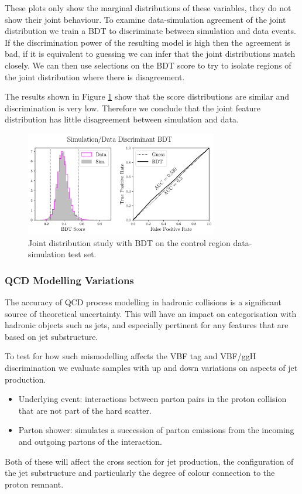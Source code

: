 These plots only show the marginal distributions of these variables, they do not show their joint behaviour. 
To examine data-simulation agreement of the joint distribution we train a BDT to discriminate between simulation and data events. 
If the discrimination power of the resulting model is high then the agreement is bad, if it is equivalent to guessing we can infer that the joint distributions match closely. 
We can then use selections on the BDT score to try to isolate regions of the joint distribution where there is disagreement. 

The results shown in Figure \ref{fig:event_categorisation:zee_bdt_validation} show that the score distributions are similar and discrimination is very low. 
Therefore we conclude that the joint feature distribution has little disagreement between simulation and data. 
\begin{figure}[h!]
    \includegraphics[width=0.75\textwidth]{figures/event_selection/eng_feature_ROC_Zee_BDT.pdf}
    \caption{Joint distribution study with BDT on the \Zee control region data-simulation test set.}
    \label{fig:event_categorisation:zee_bdt_validation}
\end{figure}


\subsubsection{QCD Modelling Variations}
The accuracy of QCD process modelling in hadronic collisions is a significant source of theoretical uncertainty. 
This will have an impact on categorisation with hadronic objects such as jets, and especially pertinent for any features that are based on jet substructure. 

To test for how such mismodelling affects the VBF tag and VBF/ggH discrimination we evaluate samples with up and down variations on aspects of jet production.
\begin{itemize}[noitemsep]
    \item Underlying event: interactions between parton pairs in the proton collision that are not part of the hard scatter. 
    \item Parton shower: simulates a succession of parton emissions from the incoming and outgoing partons of the interaction.
\end{itemize}
Both of these will affect the cross section for jet production, the configuration of the jet substructure and particularly the degree of colour connection to the proton remnant.

